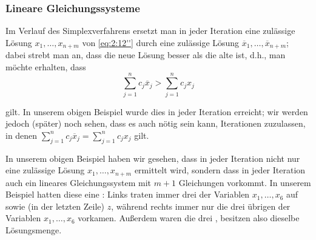 \documentclass[smaller]{beamer}
\begin{document}
\begin{frame}
 \frametitle{Lineare Gleichungssysteme}
 Im Verlauf des Simplexverfahrens ersetzt man in jeder Iteration eine zulässige Lösung $x_1, \ldots, x_{n+m}$ von \eqref{eq:2:12''} durch eine zulässige Lösung $\overline{x}_1, \ldots, \overline{x}_{n+m}$; dabei strebt man an, dass die neue Lösung besser als die alte ist, d.h., man möchte erhalten, dass
\[
\sum\limits_{j=1}^{n}{c_j\overline{x}_j} > \sum\limits_{j=1}^{n}{c_jx_j}
\]

gilt. In unserem obigen Beispiel wurde dies in jeder Iteration erreicht; \alert{wir werden jedoch (später) noch sehen, dass es auch nötig sein kann, Iterationen zuzulassen, in denen $\sum\limits_{j=1}^{n}{c_j\overline{x}_j} = \sum\limits_{j=1}^{n}{c_jx_j}$ gilt}.

In unserem obigen Beispiel haben wir gesehen, dass in jeder Iteration nicht nur eine zulässige Lösung $x_1, \ldots, x_{n+m}$ ermittelt wird, sondern dass in jeder Iteration auch ein lineares Gleichungssystem mit $m+1$ Gleichungen vorkommt. In unserem Beispiel 
hatten diese eine : Links traten immer drei der Variablen $x_1,\ldots,x_6$ auf sowie (in der letzten Zeile) $z$, während rechts immer nur die drei übrigen der Variablen $x_1, \ldots, x_6$ vorkamen. Außerdem waren die drei , besitzen also dieselbe Lösungsmenge. 
\end{frame}
\end{document}

